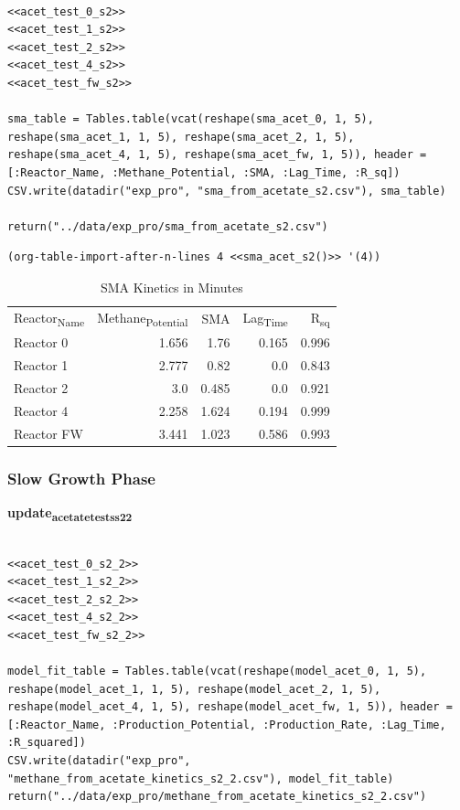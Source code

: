\documentclass[11pt]{article}
\begin{document}
\begin{verbatim}

<<acet_test_0_s2>>
<<acet_test_1_s2>>
<<acet_test_2_s2>>
<<acet_test_4_s2>>
<<acet_test_fw_s2>>

sma_table = Tables.table(vcat(reshape(sma_acet_0, 1, 5), reshape(sma_acet_1, 1, 5), reshape(sma_acet_2, 1, 5), reshape(sma_acet_4, 1, 5), reshape(sma_acet_fw, 1, 5)), header = [:Reactor_Name, :Methane_Potential, :SMA, :Lag_Time, :R_sq])
CSV.write(datadir("exp_pro", "sma_from_acetate_s2.csv"), sma_table)

return("../data/exp_pro/sma_from_acetate_s2.csv")
\end{verbatim}

\begin{verbatim}
(org-table-import-after-n-lines 4 <<sma_acet_s2()>> '(4))
\end{verbatim}

\begin{table}[htbp]
\caption{SMA Kinetics in Minutes}
\centering
\begin{tabular}{lrrrr}
Reactor\textsubscript{Name} & Methane\textsubscript{Potential} & SMA & Lag\textsubscript{Time} & R\textsubscript{sq}\\[0pt]
Reactor 0 & 1.656 & 1.76 & 0.165 & 0.996\\[0pt]
Reactor 1 & 2.777 & 0.82 & 0.0 & 0.843\\[0pt]
Reactor 2 & 3.0 & 0.485 & 0.0 & 0.921\\[0pt]
Reactor 4 & 2.258 & 1.624 & 0.194 & 0.999\\[0pt]
Reactor FW & 3.441 & 1.023 & 0.586 & 0.993\\[0pt]
\end{tabular}
\end{table}

\subsubsection{Slow Growth Phase}
\label{sec:org803d73a}
\textbf{update\textsubscript{acetate}\textsubscript{tests}\textsubscript{s2}\textsubscript{2}}
\begin{verbatim}

<<acet_test_0_s2_2>>
<<acet_test_1_s2_2>>
<<acet_test_2_s2_2>>
<<acet_test_4_s2_2>>
<<acet_test_fw_s2_2>>

model_fit_table = Tables.table(vcat(reshape(model_acet_0, 1, 5), reshape(model_acet_1, 1, 5), reshape(model_acet_2, 1, 5), reshape(model_acet_4, 1, 5), reshape(model_acet_fw, 1, 5)), header = [:Reactor_Name, :Production_Potential, :Production_Rate, :Lag_Time, :R_squared])
CSV.write(datadir("exp_pro", "methane_from_acetate_kinetics_s2_2.csv"), model_fit_table)
return("../data/exp_pro/methane_from_acetate_kinetics_s2_2.csv")
\end{verbatim}
\end{document}
